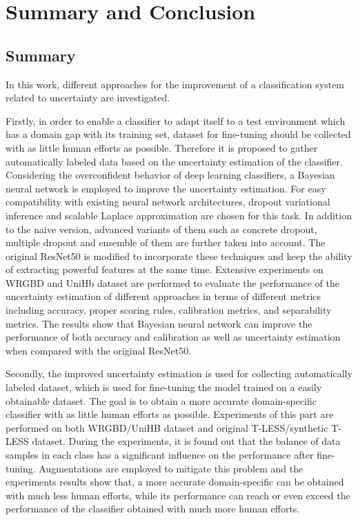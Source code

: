\chapter{Summary and Conclusion}
\section{Summary}
In this work, different approaches for the improvement of a classification system related to uncertainty are investigated.
 
Firstly, in order to enable a classifier to adapt itself to a test environment which has a domain gap with its training set, dataset for fine-tuning should be collected with as little human efforts as possible.
Therefore it is proposed to gather automatically labeled data based on the uncertainty estimation of the classifier.
Considering the overconfident behavior of deep learning classifiers, a Bayesian neural network is employed to improve the uncertainty estimation.
For easy compatibility with existing neural network architectures, dropout variational inference and scalable Laplace approximation are chosen for this task.
In addition to the naive version, advanced variants of them such as concrete dropout, multiple dropout and ensemble of them are further taken into account.
The original ResNet50 is modified to incorporate these techniques and keep the ability of extracting powerful features at the same time.
Extensive experiments on WRGBD and UniHb dataset are performed to evaluate the performance of the uncertainty estimation of different approaches in terms of different metrics including accuracy, proper scoring rules, calibration metrics, and separability metrics.
The results show that Bayesian neural network can improve the performance of both accuracy and calibration as well as uncertainty estimation when compared with the original ResNet50. 

Secondly, the improved uncertainty estimation is used for collecting automatically labeled dataset, which is used for fine-tuning the model trained on a easily obtainable dataset.
The goal is to obtain a more accurate domain-specific classifier with as little human efforts as possible.
Experiments of this part are performed on both WRGBD/UniHB dataset and original T-LESS/synthetic T-LESS dataset.
During the experiments, it is found out that the balance of data samples in each class has a significant influence on the performance after fine-tuning.
Augmentations are employed to mitigate this problem and the experiments results show that, a more accurate domain-specific can be obtained with much less human efforts, while its performance can reach or even exceed the performance of the classifier obtained with much more human efforts.

